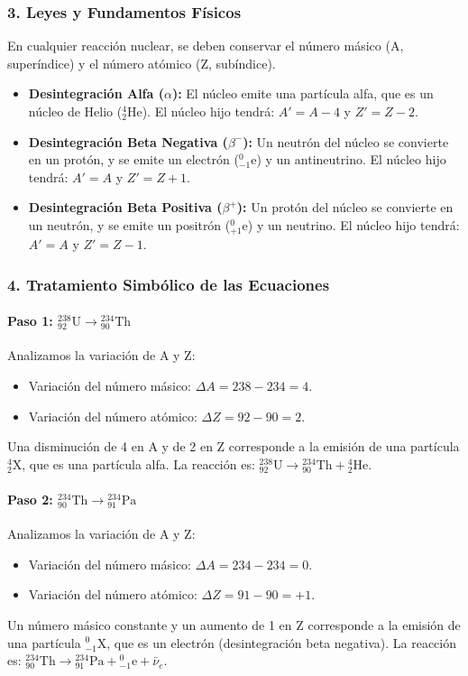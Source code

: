\subsubsection*{3. Leyes y Fundamentos Físicos}
En cualquier reacción nuclear, se deben conservar el número másico (A, superíndice) y el número atómico (Z, subíndice).
\begin{itemize}
    \item \textbf{Desintegración Alfa ($\alpha$):} El núcleo emite una partícula alfa, que es un núcleo de Helio (${}_2^4\text{He}$).
    El núcleo hijo tendrá: $A' = A - 4$ y $Z' = Z - 2$.
    \item \textbf{Desintegración Beta Negativa ($\beta^-$):} Un neutrón del núcleo se convierte en un protón, y se emite un electrón (${}_{-1}^0\text{e}$) y un antineutrino.
    El núcleo hijo tendrá: $A' = A$ y $Z' = Z + 1$.
    \item \textbf{Desintegración Beta Positiva ($\beta^+$):} Un protón del núcleo se convierte en un neutrón, y se emite un positrón (${}_{+1}^0\text{e}$) y un neutrino.
    El núcleo hijo tendrá: $A' = A$ y $Z' = Z - 1$.
\end{itemize}

\subsubsection*{4. Tratamiento Simbólico de las Ecuaciones}
\paragraph{Paso 1: ${}_{92}^{238}\text{U} \to {}_{90}^{234}\text{Th}$}
Analizamos la variación de A y Z:
\begin{itemize}
    \item Variación del número másico: $\Delta A = 238 - 234 = 4$.
    \item Variación del número atómico: $\Delta Z = 92 - 90 = 2$.
\end{itemize}
Una disminución de 4 en A y de 2 en Z corresponde a la emisión de una partícula ${}_2^4\text{X}$, que es una partícula alfa.
La reacción es: ${}_{92}^{238}\text{U} \to {}_{90}^{234}\text{Th} + {}_2^4\text{He}$.

\paragraph{Paso 2: ${}_{90}^{234}\text{Th} \to {}_{91}^{234}\text{Pa}$}
Analizamos la variación de A y Z:
\begin{itemize}
    \item Variación del número másico: $\Delta A = 234 - 234 = 0$.
    \item Variación del número atómico: $\Delta Z = 91 - 90 = +1$.
\end{itemize}
Un número másico constante y un aumento de 1 en Z corresponde a la emisión de una partícula ${}_{-1}^0\text{X}$, que es un electrón (desintegración beta negativa).
La reacción es: ${}_{90}^{234}\text{Th} \to {}_{91}^{234}\text{Pa} + {}_{-1}^0\text{e} + \bar{\nu}_e$.

